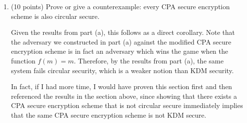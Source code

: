 \documentclass{article}
\begin{document}
\begin{enumerate}[,label=\alph*.]
\begin{enumerate}[noitemsep,topsep=\mdcompacttopsep]
\item{}
Upon receipt of $c^{**} = E'_{e'}(m_b)$, the adversary simply compute $m_{b'} = D'_{c^*}(c^{**})$ and outputs $b'$.%
We claim that the above adversary always wins the game. 

\begin{mdbmarginx}{1ex}{0pt}{1ex}{0pt}%
\noindent{}\textbf{Proof}.  Note that winning the game occurs when $b = b'$. We claim that this is the case bceause $m_b = m_{b'}$. 
By construction,%
\end{mdbmarginx}%
\noindent\noindent\[%
\begin{aligned}
m_{b'} &= D'_{c^*}(c^{**})) \\
&= D'_{ E'_{e'}(f(d))}( E'_{e'}(m_b)) \\
&=D'_{ E'_{e'}(d)}( E'_{e'}(m_b)) \\
&=  D'_d( E'_{e'}(m_b)) \\
&= m_b
\end{aligned}
\]%
We thereby conclude that not all CPA secure schems are KDM secure.
\mdfloatright{\ensuremath{\Box}}%
\end{enumerate}%

\item{}
(10 points) Prove or give a counterexample: every CPA secure encryption scheme is also circular secure.%

Given the results from part (a), this follows as a direct corollary. Note that the adversary we 
constructed in part (a) against the modified CPA secure encryption scheme is in fact an adversary
which wins the game when the function $f(m) = m$. Therefore, by the results from part (a), the
same system fails circular security, which is a weaker notion than KDM security.%

In fact, if I had more time, I would have proven this section first and then referenced the results
in the section above, since showing that there exists a CPA secure encryption scheme that is not
circular secure immediately implies that the same CPA secure encryption scheme is not KDM secure.%


\end{enumerate}
\end{document}
